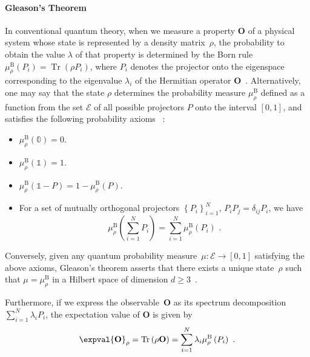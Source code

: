\documentclass[english,reprint, aps, prl,superscriptaddress, showpacs,
showkeys, longbibliography, amsmath, amssymb]{revtex4-1}
\theoremstyle{plain}
\theoremstyle{definition}
\newcommand{\events}{\ensuremath{\mathcal{E}}}
\newcommand{\Tr}{\ensuremath{\mathop{\mathrm{Tr}}\nolimits}}
\begin{document}
\paragraph{Gleason's Theorem}

In conventional quantum theory, when we measure a property $\mathbf{O}$
of a physical system whose state is represented by a density matrix~$\rho$,
the probability to obtain the value $\lambda$ of that property is
determined by the Born rule $\mu_{\rho}^{\mathrm{B}}\left(P_{i}\right)=\Tr\left(\rho P_{i}\right)$,
where $P_{i}$ denotes the projector onto the eigenspace corresponding
to the eigenvalue $\lambda_{i}$ of the Hermitian operator $\mathbf{O}$~\cite{Born1983,peres1995quantum,544199,Jaeger2007}.
Alternatively, one may say that the state $\rho$ determines the probability
measure $\mu_{\rho}^{\mathrm{B}}$ defined as a function from the
set $\events$ of all possible projectors $P$ onto the interval $[0,1]$,
and satisfies the following probability axioms~ \cite{10.2307/2308516,gleason1957,Redhead1987-REDINA,Maassen2010}: 
\begin{itemize}
\item $\mu_{\rho}^{\mathrm{B}}(\mathbb{0})=0$. 
\item $\mu_{\rho}^{\mathrm{B}}(\mathbb{1})=1$. 
\item $\mu_{\rho}^{\mathrm{B}}\left(\mathbb{1}-P\right)=
1-\mu_{\rho}^{\mathrm{B}}\left(P\right)$. 
\item For a set of mutually orthogonal projectors $\left\{ P_{i}\right\} _{i=1}^{N}$,
$P_iP_j=\delta_{ij}P_i$,
we have 
\begin{equation}
\mu_{\rho}^{\mathrm{B}}\left(\sum_{i=1}^{N}P_{i}\right)=
\sum_{i=1}^{N}\mu_{\rho}^{\mathrm{B}}\left(P_{i}\right)
\textrm{ .}\label{eq:QuantumProbability-Addition}
\end{equation}
\end{itemize}
Conversely, given any quantum probability measure~$\mu:\events\rightarrow[0,1]$
satisfying the above axioms, Gleason's theorem asserts that there
exists a unique state~$\rho$ such that $\mu=\mu_{\rho}^{\mathrm{B}}$
in a Hilbert space of dimension $d\geq3$~\cite{gleason1957,Redhead1987-REDINA,peres1995quantum}.

Furthermore, if we express the observable~$\mathbf{O}$ as its spectrum
decomposition~$\sum_{i=1}^{N}\lambda_{i}P_{i}$, the expectation
value of $\mathbf{O}$ is given by~\cite{peres1995quantum,544199,Jaeger2007}
\begin{equation}
\expval{\mathbf{O}}_{\rho}=\Tr\left(\rho\mathbf{O}\right)=\sum_{i=1}^{N}\lambda_{i}\mu_{\rho}^{\mathrm{B}}\left(P_{i}\right)\ .\label{eq:quantum-expectation}
\end{equation}
\end{document}
